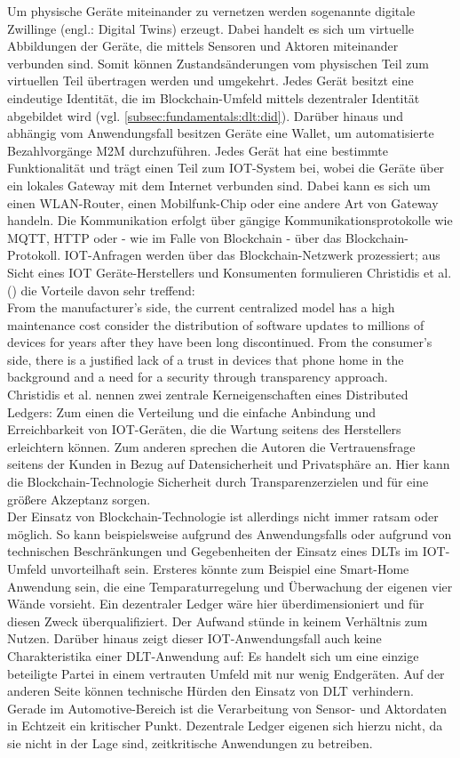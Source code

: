 Um physische Geräte miteinander zu vernetzen werden sogenannte digitale Zwillinge (engl.: Digital Twins) erzeugt. Dabei handelt es sich um virtuelle Abbildungen der Geräte, die mittels Sensoren und Aktoren miteinander verbunden sind. Somit können Zustandsänderungen vom physischen Teil zum virtuellen Teil übertragen werden und umgekehrt. Jedes Gerät besitzt eine eindeutige Identität, die im Blockchain-Umfeld mittels dezentraler Identität abgebildet wird (vgl. \ref{subsec:fundamentals:dlt:did}). Darüber hinaus und abhängig vom Anwendungsfall besitzen Geräte eine Wallet, um automatisierte Bezahlvorgänge \ac{M2M} durchzuführen. Jedes Gerät hat eine bestimmte Funktionalität und trägt einen Teil zum \ac{IOT}-System bei, wobei die Geräte über ein lokales Gateway mit dem Internet verbunden sind. Dabei kann es sich um einen WLAN-Router, einen Mobilfunk-Chip oder eine andere Art von Gateway handeln. Die Kommunikation erfolgt über gängige Kommunikationsprotokolle wie MQTT, HTTP oder - wie im Falle von Blockchain - über das Blockchain-Protokoll. \ac{IOT}-Anfragen werden über das Blockchain-Netzwerk prozessiert; aus Sicht eines \ac{IOT} Geräte-Herstellers und Konsumenten formulieren Christidis et al. (\cite{SCIOT2016}) die Vorteile davon sehr treffend:\\
\glqq From the manufacturer's side, the current centralized model has a high maintenance cost consider the distribution of software updates to millions of devices for years after they have been long discontinued. From the consumer's side, there is a justified lack of a trust in devices that phone home in the background and a need for a security through transparency approach.\grqq\\
Christidis et al. nennen zwei zentrale Kerneigenschaften eines Distributed Ledgers: Zum einen die Verteilung und die einfache Anbindung und Erreichbarkeit von \ac{IOT}-Geräten, die die Wartung seitens des Herstellers erleichtern können. Zum anderen sprechen die Autoren die Vertrauensfrage seitens der Kunden in Bezug auf Datensicherheit und Privatsphäre an. Hier kann die Blockchain-Technologie \glqq Sicherheit durch Transparenz\grqq erzielen und für eine größere Akzeptanz sorgen.\\
Der Einsatz von Blockchain-Technologie ist allerdings nicht immer ratsam oder möglich. So kann beispielsweise aufgrund des Anwendungsfalls oder aufgrund von technischen Beschränkungen und Gegebenheiten der Einsatz eines \ac{DLT}s im \ac{IOT}-Umfeld unvorteilhaft sein. Ersteres könnte zum Beispiel eine Smart-Home Anwendung sein, die eine Temparaturregelung und Überwachung der eigenen vier Wände vorsieht. Ein dezentraler Ledger wäre hier überdimensioniert und für diesen Zweck überqualifiziert. Der Aufwand stünde in keinem Verhältnis zum Nutzen. Darüber hinaus zeigt dieser \ac{IOT}-Anwendungsfall auch keine Charakteristika einer \ac{DLT}-Anwendung auf: Es handelt sich um eine einzige beteiligte Partei in einem vertrauten Umfeld mit nur wenig Endgeräten. Auf der anderen Seite können technische Hürden den Einsatz von \ac{DLT} verhindern. Gerade im Automotive-Bereich ist die Verarbeitung von Sensor- und Aktordaten in Echtzeit ein kritischer Punkt. Dezentrale Ledger eigenen sich hierzu nicht, da sie nicht in der Lage sind, zeitkritische Anwendungen zu betreiben.\\
